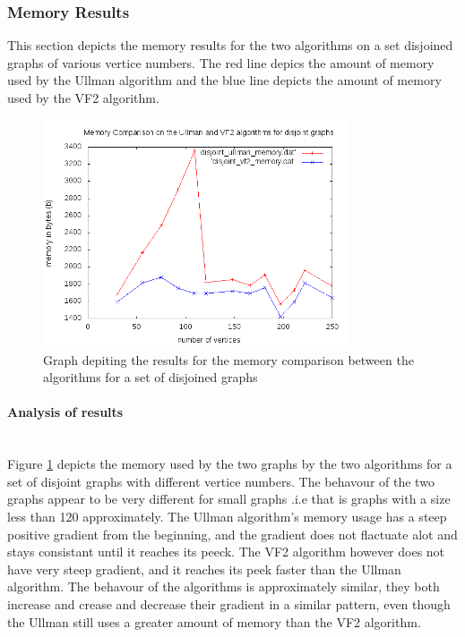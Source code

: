 \subsubsection{Memory Results}
This section depicts the memory results for the two algorithms on a set disjoined graphs of various vertice numbers. The red line depics the amount of memory
 used by the Ullman algorithm and the blue line depicts the amount of memory used by the VF2 algorithm.
\begin{figure}[H]
  \begin{center}
      \includegraphics[width=0.8\textwidth]{disjoint_memory.png}
  \end{center}    
  \caption{Graph depiting the results for the memory comparison between the algorithms for a set of disjoined graphs}
  \label{fig:disjoint_memory_comparison}
\end{figure}

\paragraph{Analysis of results}\mbox{}\\
Figure \ref{fig:disjoint_memory_comparison} depicts the memory used by the two graphs by the two algorithms for a set of disjoint graphs with different vertice 
numbers.\newline\newline
The behavour of the two graphs appear to be very different for small graphs .i.e that is graphs with a size less than 120 approximately. The Ullman algorithm's
memory usage has a steep positive gradient from the beginning, and the gradient does not flactuate alot and stays consistant until it reaches its peeck.
The VF2 algorithm however does not have very steep gradient, and it reaches its peek faster than the Ullman algorithm.\newline\newline
The behavour of the algorithms is approximately similar, they both increase and crease and decrease their gradient in a similar pattern, even though the Ullman
 still uses a greater amount of memory than the VF2 algorithm.
 
